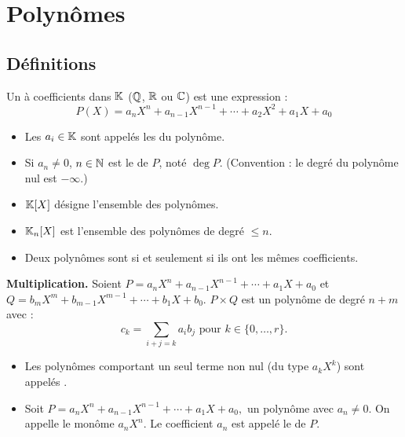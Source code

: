 \documentclass[10pt,class=article,crop=false]{standalone}
\begin{document}
\section{Polynômes}

\begin{multicols}{2}
	

\subsection{Définitions}

Un  à coefficients dans $\mathbb{K}$ ($\mathbb{Q}$, $\mathbb{R}$ ou $\mathbb{C}$)
est une expression :
$$P(X) = a_n X^n + a_{n-1} X^{n-1} + \cdots + a_2 X^2 + a_1 X + a_0$$

\begin{itemize}
	\item Les $a_i \in \mathbb{K}$ sont appelés les  du polynôme.
	
	\item Si $a_n \neq 0$, $n \in \mathbb{N}$ est le  de $P$, noté 
	$\deg P$. (Convention : le degré du polynôme nul est $-\infty$.)

	\item $\mathbb{K}[X]$ désigne l'ensemble des polynômes.
	
    \item $\mathbb{K}_n[X]$ est l'ensemble des polynômes de degré $\le n$.
    
    \item Deux polynômes sont  si et seulement si ils ont les mêmes coefficients.
    
\end{itemize}


\textbf{Multiplication.}
Soient  $P=a_nX^n+a_{n-1}X^{n-1}+\cdots + a_1X+a_0$ et
$Q=b_mX^m+b_{m-1}X^{m-1}+\cdots+b_1X+b_0$.
$P \times Q$ est un polynôme de degré $n+m$ avec :
$$c_k=\sum_{i+j=k}a_ib_j  \text{ pour }k\in \{0,\ldots, r\}.$$



\begin{itemize}
	\item Les polynômes comportant un seul terme non nul (du type $a_kX^k$) sont
	appelés .
	
	\item Soit $P=a_nX^n+a_{n-1}X^{n-1}+\cdots + a_1X+a_0,$ un polynôme avec
	$a_n\neq0$. On appelle  le monôme $a_nX^n$. Le coefficient
	$a_n$ est appelé le  de $P$.
	

\end{itemize}
\end{multicols}
\end{document}
